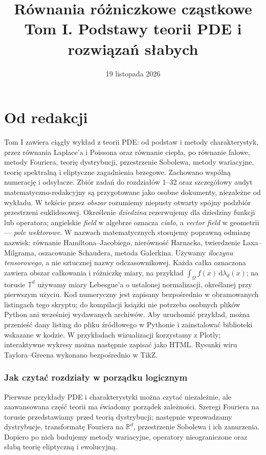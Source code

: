 \documentclass[11pt,a4paper,oneside]{book}
\title{Równania różniczkowe cząstkowe\\\large Tom I. Podstawy teorii PDE i rozwiązań słabych}
\author{}
\date{19 listopada 2026}
\numberwithin{equation}{chapter}
\theoremstyle{plain}
\theoremstyle{definition}
\theoremstyle{remark}
\newcommand{\R}{\mathbb{R}}
\newcommand{\T}{\mathbb{T}}
\begin{document}
\frontmatter
\hypersetup{pageanchor=false}
\maketitle
\hypersetup{pageanchor=true}
\tableofcontents
\chapter*{Od redakcji}
Tom I zawiera ciągły wykład z teorii PDE: od podstaw i metody
charakterystyk, przez równania Laplace'a i Poissona oraz
równanie ciepła, po równanie falowe, metody Fouriera, teorię dystrybucji, przestrzenie Sobolewa, metody wariacyjne, teorię spektralną i eliptyczne zagadnienia brzegowe. Zachowano wspólną
numerację i odsyłacze. Zbiór zadań do rozdziałów 1--32
oraz szczegółowy audyt matematyczno-redakcyjny są
przygotowane jako osobne dokumenty, niezależne od wykładu.
W tekście przez \emph{obszar} rozumiemy niepusty otwarty
spójny podzbiór przestrzeni euklidesowej. Określenie
\emph{dziedzina} rezerwujemy dla dziedziny funkcji lub operatora;
angielskie \emph{field} w algebrze oznacza \emph{ciało},
a \emph{vector field} w geometrii — \emph{pole wektorowe}.
W nazwach matematycznych stosujemy poprawną odmianę nazwisk:
równanie Hamiltona--Jacobiego, nierówność Harnacka,
twierdzenie Laxa--Milgrama, oszacowanie Schaudera,
metoda Galerkina. Używamy \emph{iloczynu tensorowego},
a nie sztucznej nazwy odczasownikowej.
Każda całka oznaczona zawiera obszar całkowania i różniczkę
miary, na przykład $\int_\Omega f(x)\,\mathrm d\lambda_d(x)$;
na torusie $\T^d$ używamy miary Lebesgue'a o ustalonej
normalizacji, określanej przy pierwszym użyciu.
Kod numeryczny jest zapisany bezpośrednio w obramowanych
listingach tego skryptu; do kompilacji książki nie potrzeba
osobnych plików Python ani wcześniej wydawanych archiwów.
Aby uruchomić przykład, można przenieść dany listing do pliku
źródłowego w Pythonie i zainstalować biblioteki wskazane w kodzie.
W przykładach wizualizacji korzystamy z Plotly;
interaktywne wykresy można następnie zapisać jako HTML.
Rysunki wiru Taylora--Greena wykonano bezpośrednio w TikZ.

\subsection*{Jak czytać rozdziały w porządku logicznym}
Pierwsze przykłady PDE i charakterystyki można czytać niezależnie,
ale zaawansowana część teorii ma świadomy porządek zależności.
Szeregi Fouriera na torusie przedstawiamy przed teorią dystrybucji;
następnie wprowadzamy dystrybucje, transformatę Fouriera na
$\R^d$, przestrzenie Sobolewa i ich zanurzenia. Dopiero po nich
budujemy metody wariacyjne, operatory nieograniczone oraz
słabą teorię eliptyczną i ewolucyjną.
\end{document}
